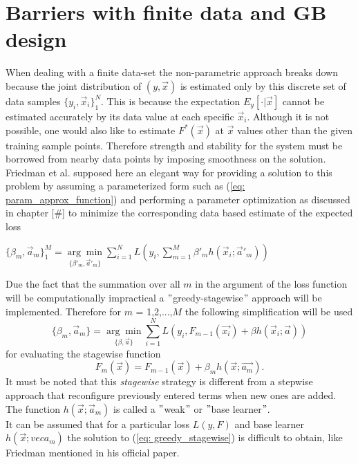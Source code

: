 \documentclass[12pt, a4paper]{article}
\begin{document}
\newpage
\section{Barriers with finite data and GB design}
When dealing with a finite data-set the non-parametric approach breaks down because the joint distribution of $(y,\vec{x})$ is estimated only by this discrete set of data samples $\{y_i,\vec{x}_i\}_1^N$. This is because the expectation $E_y[\cdot|\vec{x}]$ cannot be estimated accurately by its data value at each specific $\vec{x}_i$. Although it is not possible, one would also like to estimate $F^{\ast}(\vec{x})$ at $\vec{x}$ values other than the given training sample points.
Therefore strength and stability for the system must be borrowed from nearby data points by imposing smoothness on the solution. 
Friedman et al. supposed here an elegant way for providing a solution to this problem by assuming a parameterized form such as (\ref{eq: param_approx_function}) and performing a parameter optimization as discussed in chapter [\#] to minimize the corresponding data based estimate of the expected loss
\begin{center}
    \label{eq: greedy_stagewise}
    $\{\beta_m,\vec{a}_m\}_1^M = \underset{ \{\beta'_m,\vec{a}'_m \} }{\arg\min} 
    \sum_{i=1}^N L
    \left(y_i,\sum_{m=1}^M\beta'_{m} h(\vec{x}_i;\vec{a}'_m)\right)$
\end{center}
Due the fact that the summation over all $m$ in the argument of the loss function will be computationally impractical a $"$greedy-stagewise$"$ approach will be implemented. Therefore for $m$ = 1,2,...,$M$ the following simplification will be used
\begin{equation}
        \{\beta_m,\vec{a}_m\} = \underset{ \{\beta,\vec{a} \} }{\arg\min} 
    \sum_{i=1}^N L
    (y_i,F_{m-1}(\vec{x_i}) + \beta h(\vec{x}_i;\vec{a}))
\end{equation}
for evaluating the stagewise function 
\begin{equation}
    F_m(\vec{x}) = F_{m-1}(\vec{x}) + \beta_m h(\vec{x};\vec{a_m}).
\end{equation}
It must be noted that this \textit{stagewise} strategy is different from a stepwise approach that reconfigure previously entered terms when new ones are added. The function $h(\vec{x};\vec{a}_m)$ is called a $"$weak$"$ or $"$base learner$"$. \\
It can be assumed that for a particular loss $L(y,F)$ and base learner $h(\vec{x};vec{a}_m)$ the solution to (\ref{eq: greedy_stagewise}) is difficult to obtain, like Friedman mentioned in his official paper.
\end{document}
